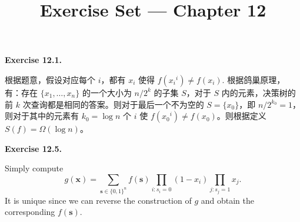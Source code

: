 \documentclass[a4paper]{article}
\title{Exercise Set --- Chapter 12}
\date{}
\newenvironment{exercise}[1]{
	\par
	\noindent\textbf{Exercise #1.}\quad
}{
	\par
	\bigskip
}
\newcommand{\bin}{\{0,1\}}
\begin{document}
    \maketitle
    \begin{exercise}{12.1}
        根据题意，假设对应每个 $i$，都有 $x_i$ 使得 $f({x_i}^i)\neq f(x_i)$. 根据鸽巢原理，有：存在 $\{x_1,\dots,x_n\}$ 的一个大小为 $n/{2^k}$ 的子集 $S$，对于 $S$ 内的元素，决策树的前 $k$ 次查询都是相同的答案。则对于最后一个不为空的 $S=\{x_0\}$，即 $n/{2^{k_0}}=1$，则对于其中的元素有 $k_0=\log n$ 个 $i$ 使 $f({x_0}^i)\neq f(x_0)$。则根据定义 $S(f)=\Omega(\log n)$。
    \end{exercise}
    \begin{exercise}{12.5}
        Simply compute 
        $$
        g(\bm x)=\sum_{\bm s\in\bin^n}f(\bm s)\prod_{i:s_i=0}(1-x_i)\prod_{j:s_j=1}x_j.
        $$
        It is unique since we can reverse the construction of $g$ and obtain the corresponding $f(\bm s)$.
    \end{exercise}
\end{document}
